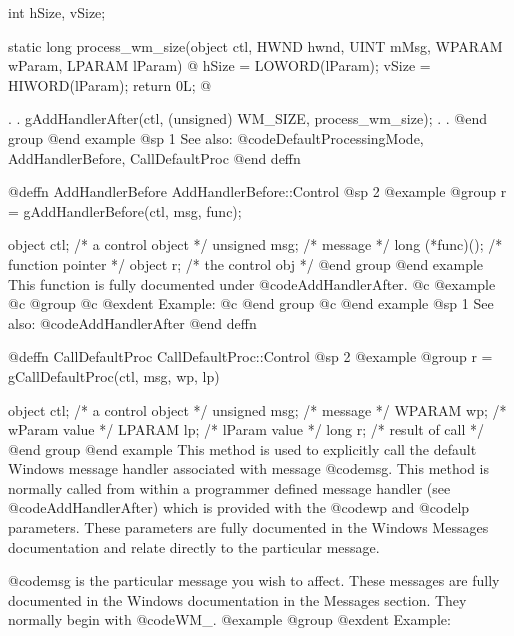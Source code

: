 int     hSize, vSize;

static  long    process_wm_size(object  ctl, 
                                HWND    hwnd, 
                                UINT    mMsg, 
                                WPARAM  wParam, 
                                LPARAM  lParam)
@{
        hSize = LOWORD(lParam);
        vSize = HIWORD(lParam);
        return 0L;
@}

        .
        .
        gAddHandlerAfter(ctl, (unsigned) WM_SIZE, process_wm_size);
        .
        .
@end group
@end example
@sp 1
See also:  @code{DefaultProcessingMode, AddHandlerBefore, CallDefaultProc}
@end deffn






@deffn {AddHandlerBefore} AddHandlerBefore::Control
@sp 2
@example
@group
r = gAddHandlerBefore(ctl, msg, func);

object   ctl;      /*  a control object  */
unsigned msg;      /*  message           */
long    (*func)(); /*  function pointer  */
object  r;         /*  the control obj   */
@end group
@end example
This function is fully documented under @code{AddHandlerAfter}.
@c @example
@c @group
@c @exdent Example:
@c @end group
@c @end example
@sp 1
See also:  @code{AddHandlerAfter}
@end deffn









@deffn {CallDefaultProc} CallDefaultProc::Control
@sp 2
@example
@group
r = gCallDefaultProc(ctl, msg, wp, lp)

object   ctl;   /*  a control object  */
unsigned msg;   /*  message           */
WPARAM   wp;    /*  wParam value      */
LPARAM   lp;    /*  lParam value      */
long     r;     /*  result of call    */
@end group
@end example
This method is used to explicitly call the default Windows message handler
associated with message @code{msg}.  This method is normally called from
within a programmer defined message handler (see @code{AddHandlerAfter})
which is provided with the @code{wp} and @code{lp} parameters.  These
parameters are fully documented in the Windows Messages documentation
and relate directly to the particular message.

@code{msg} is the particular message you wish to affect.  These messages
are fully documented in the Windows documentation in the Messages
section.  They normally begin with @code{WM_}.
@example
@group
@exdent Example:

